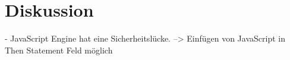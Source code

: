 \chapter{Diskussion}

- JavaScript Engine hat eine Sicherheitslücke. --> Einfügen von JavaScript in Then Statement Feld möglich

